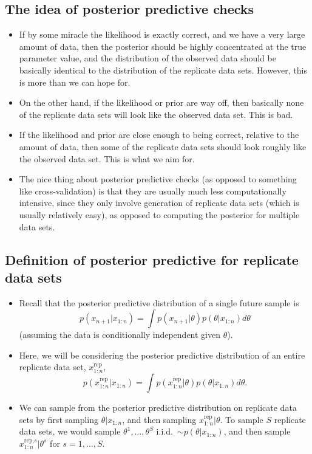 \documentclass[12pt]{article}
\begin{document}
\subsection*{The idea of posterior predictive checks}
\begin{itemize}
\item If by some miracle the likelihood is exactly correct, and we have a very large amount of data, then the posterior should be highly concentrated at the true parameter value, and the distribution of the observed data should be basically identical to the distribution of the replicate data sets. However, this is more than we can hope for.
\item On the other hand, if the likelihood or prior are way off, then basically none of the replicate data sets will look like the observed data set. This is bad.
\item If the likelihood and prior are close enough to being correct, relative to the amount of data, then some of the replicate data sets should look roughly like the observed data set. This is what we aim for.
\item The nice thing about posterior predictive checks (as opposed to something like cross-validation) is that they are usually much less computationally intensive, since they only involve generation of replicate data sets (which is usually relatively easy), as opposed to computing the posterior for multiple data sets.
\end{itemize}



\subsection*{Definition of posterior predictive for replicate data sets}
\begin{itemize}
\item Recall that the posterior predictive distribution of a single future sample is 
$$p(x_{n +1}| x_{1:n}) = \int p(x_{n +1} | \theta)p(\theta | x_{1:n}) d \theta $$
(assuming the data is conditionally independent given $\theta$).
\item Here, we will be considering the posterior predictive distribution of an entire replicate data set, $x_{1:n}^\text{rep}$,
$$ p(x_{1:n}^\text{rep} | x_{1:n}) = \int p(x_{1:n}^\text{rep} | \theta)p(\theta | x_{1:n}) d \theta. $$
\item We can sample from the posterior predictive distribution on replicate data sets by first sampling $\theta | x_{1:n}$, and then sampling $x_{1:n}^\text{rep}| \theta$.  To sample $S$ replicate data sets, we would sample $\theta^1,\ldots,\theta^S$ i.i.d.\ $\sim p(\theta | x_{1:n})$, and then sample $x_{1:n}^{\text{rep,}s} | \theta^{s}$ for $s = 1,\ldots,S$.
\end{itemize}
\end{document}
